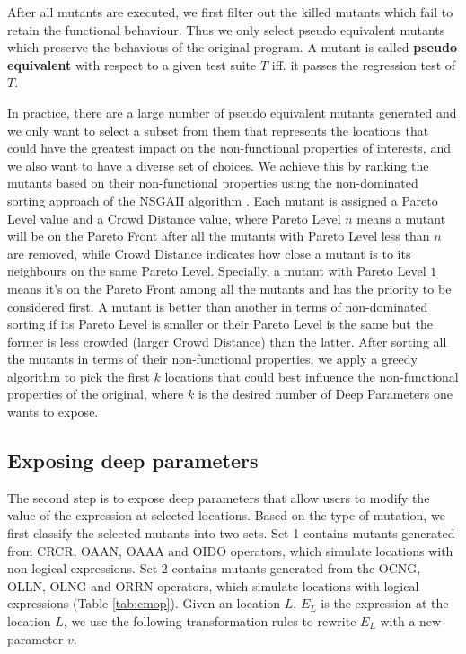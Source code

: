 After all mutants are executed, we first filter out the killed mutants which fail to retain the functional behaviour.  Thus we only select pseudo equivalent mutants which preserve the behavious of the original program. A mutant is called \textbf{pseudo equivalent} with respect to a given test suite $T$ iff. it passes the regression test of $T$.

In practice, there are a large number of pseudo equivalent mutants \cite{5477100} generated and we only want to select a subset from them that represents the locations that could have the greatest impact on the non-functional properties of interests, and we also want to have a diverse set of choices.  
We achieve this by ranking the mutants based on their non-functional properties using the non-dominated sorting approach of the NSGAII algorithm \cite{996017}. Each mutant is assigned a Pareto Level value and a Crowd Distance value, where Pareto Level $n$ means a mutant will be on the Pareto Front after all the mutants with Pareto Level less than $n$ are removed, while Crowd Distance indicates how close a mutant is to its neighbours on the same Pareto Level. Specially, a mutant with Pareto Level $1$ means it's on the Pareto Front among all the mutants and has the priority to be considered first. A mutant is better than another in terms of non-dominated sorting if its Pareto Level is smaller or their Pareto Level is the same but the former is less crowded (larger Crowd Distance) than the latter. After sorting all the mutants in terms of their non-functional properties, we apply a greedy algorithm to pick the first $k$ locations that could best influence the non-functional properties of the original, where $k$ is the desired number of Deep Parameters one wants to expose.

\subsection{Exposing deep parameters}
\label{exposing}
The second step is to expose deep parameters that allow users to modify the value of the expression at selected locations. Based on the type of mutation, we first classify the selected mutants into two sets. Set 1 contains mutants generated from CRCR, OAAN, OAAA and OIDO operators, which simulate locations with non-logical expressions. Set 2 contains mutants generated from the OCNG, OLLN, OLNG and ORRN operators, which simulate locations with logical expressions (Table \ref{tab:cmop}). 
Given an location $L$, $E_L$ is the expression at the location $L$, we use the following transformation rules to rewrite $E_L$ with a new parameter $v$.

